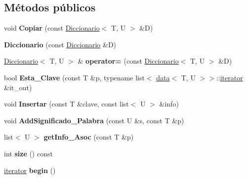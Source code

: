\subsection*{Métodos públicos}
\begin{DoxyCompactItemize}
\item 
\mbox{\label{classDiccionario_a26dc2371417e59c6bc1c76429d98c563}} 
void {\bfseries Copiar} (const \hyperlink{classDiccionario}{Diccionario}$<$ T, U $>$ \&D)
\item 
\mbox{\label{classDiccionario_ad8917f4e401b473139403dc5964e8307}} 
{\bfseries Diccionario} (const \hyperlink{classDiccionario}{Diccionario} \&D)
\item 
\mbox{\label{classDiccionario_ad30f63b3857757296f1302273ee50a3d}} 
\hyperlink{classDiccionario}{Diccionario}$<$ T, U $>$ \& {\bfseries operator=} (const \hyperlink{classDiccionario}{Diccionario}$<$ T, U $>$ \&D)
\item 
\mbox{\label{classDiccionario_a2f126e4e198fe7f6f36929c8a728caff}} 
bool {\bfseries Esta\+\_\+\+Clave} (const T \&p, typename list$<$ \hyperlink{structdata}{data}$<$ T, U $>$$>$\+::\hyperlink{classDiccionario_1_1iterator}{iterator} \&it\+\_\+out)
\item 
\mbox{\label{classDiccionario_af520b73907852cc8002260ddf9fb822c}} 
void {\bfseries Insertar} (const T \&clave, const list$<$ U $>$ \&info)
\item 
\mbox{\label{classDiccionario_a7e167da231bff610001df3c20cc9b7a7}} 
void {\bfseries Add\+Significado\+\_\+\+Palabra} (const U \&s, const T \&p)
\item 
\mbox{\label{classDiccionario_a292817b0fda893a41cd9313b4c65cc61}} 
list$<$ U $>$ {\bfseries get\+Info\+\_\+\+Asoc} (const T \&p)
\item 
\mbox{\label{classDiccionario_aa576b001759429fd58210ca57257d6f8}} 
int {\bfseries size} () const
\item 
\mbox{\label{classDiccionario_aacd300de3e06e12e8f213df624fdd46e}} 
\hyperlink{classDiccionario_1_1iterator}{iterator} {\bfseries begin} ()
$$
\end{DoxyCompactItemize}
